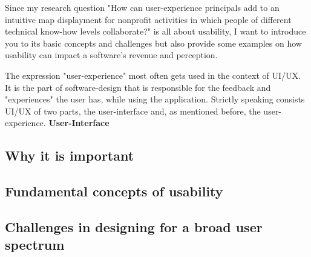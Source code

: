 Since my research question "How can user-experience principals add to an intuitive map displayment for nonprofit activities in which people of different technical know-how levels collaborate?" is all about usability, I want to introduce you to its basic concepts and challenges but also provide some examples on how usability can impact a software's revenue and perception.

\blankLine

The expression "user-experience" most often gets used in the context of UI/UX. It is the part of software-design that is responsible for the feedback and "experiences" the user has, while using the application. Strictly speaking consists UI/UX of two parts, the user-interface and, as mentioned before, the user-experience. \textbf{User-Interface}

\autocite{Paul:Usability101}


\subsection{Why it is important}

\subsection{Fundamental concepts of usability}

\subsection{Challenges in designing for a broad user spectrum}

\newpage